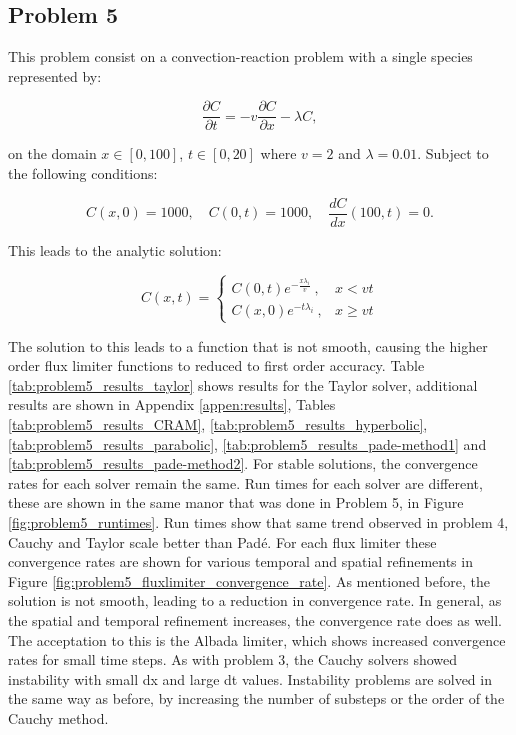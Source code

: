 \clearpage

\subsection{Problem 5}
This problem consist on a convection-reaction problem with a single species represented by:

\begin{equation}
    \frac{\partial C}{\partial t} = -v\frac{\partial C}{\partial x} - \lambda C,
\end{equation}

\noindent on the domain $x \in [0,100]$, $t \in [0,20]$ where $v = 2$ and $\lambda = 0.01$. Subject to the following conditions:

\begin{equation}
    C(x, 0) = 1000, \quad C(0,t) = 1000, \quad \frac{dC}{dx}(100, t) = 0.
\end{equation}

\noindent This leads to the analytic solution:

\begin{equation}
C (x,t) = \begin{cases}
  C (0, t) e^{-\frac{x \lambda _i}{v}}\ , & x < vt \\
  C (x, 0) e^{-t \lambda _i}\ , & x \ge vt
\end{cases}
\end{equation}

The solution to this leads to a function that is not smooth, causing the higher order flux limiter functions to reduced to first order accuracy. Table \ref{tab:problem5_results_taylor} shows results for the Taylor solver, additional results are shown in Appendix \ref{appen:results}, Tables \ref{tab:problem5_results_CRAM}, \ref{tab:problem5_results_hyperbolic}, \ref{tab:problem5_results_parabolic}, \ref{tab:problem5_results_pade-method1} and \ref{tab:problem5_results_pade-method2}. For stable solutions, the convergence rates for each solver remain the same. Run times for each solver are different, these are shown in the same manor that was done in Problem 5, in Figure \ref{fig:problem5_runtimes}. Run times show that same trend observed in problem 4, Cauchy and Taylor scale better than Pad\'e. For each flux limiter these convergence rates are shown for various temporal and spatial refinements in Figure \ref{fig:problem5_fluxlimiter_convergence_rate}. As mentioned before, the solution is not smooth, leading to a reduction in convergence rate. In general, as the spatial and temporal refinement increases, the convergence rate does as well. The acceptation to this is the Albada limiter, which shows increased convergence rates for small time steps. As with problem 3, the Cauchy solvers showed instability with small dx and large dt values. Instability problems are solved in the same way as before, by increasing the number of substeps or the order of the Cauchy method. 

